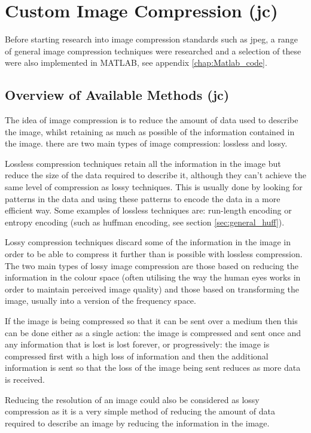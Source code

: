 \section{Custom Image Compression (jc)}
\label{Custom_comp_research}

Before starting research into image compression standards such as jpeg, a range of general image compression techniques were researched and a selection of these were also implemented in MATLAB, see appendix \ref{chap:Matlab_code}.

\subsection{Overview of Available Methods (jc)}

The idea of image compression is to reduce the amount of data used to describe the image, whilst retaining as much as possible of the information contained in the image. there are two main types of image compression: lossless and lossy.

Lossless compression techniques retain all the information in the image but reduce the size of the data required to describe it, although they can't achieve the same level of compression as lossy techniques. This is usually done by looking for patterns in the data and using these patterns to encode the data in a more efficient way. Some examples of lossless techniques are: run-length encoding or entropy encoding (such as huffman encoding, see section \ref{sec:general_huff}).

Lossy compression techniques discard some of the information in the image in order to be able to compress it further than is possible with lossless compression. The two main types of lossy image compression are those based on reducing the information in the colour space (often utilising the way the human eyes works in order to maintain perceived image quality) and those based on transforming the image, usually into a version of the frequency space.

If the image is being compressed so that it can be sent over a medium then this can be done either as a single action: the image is compressed and sent once and any information that is lost is lost forever, or progressively: the image is compressed first with a high loss of information and then the additional information is sent so that the loss of the image being sent reduces as more data is received.

Reducing the resolution of an image could also be considered as lossy compression as it is a very simple method of reducing the amount of data required to describe an image by reducing the information in the image.

